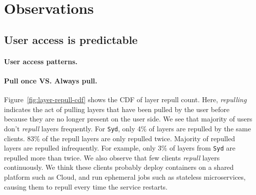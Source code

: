 \section{Observations}
\label{sec:dataset-analysis}

%
%

%




\subsection{User access is predictable}


\paragraph{User access patterns.}

\paragraph{Pull once VS. Always pull.}

Figure~\ref{fig:layer-repull-cdf} shows the CDF of layer repull count. Here, \emph{repulling} indicates the act of pulling layers that have been pulled by the user before because they are no longer present on the user side.
We see that majority of users don't \emph{repull} layers frequently.
For \texttt{Syd}, only 4\% of layers are repulled by the same clients. 83\% of the repull layers are only repulled twice.
Majority of repulled layers are repulled infrequently.
For example, only 3\% of layers from \texttt{Syd} are repulled more than twice.
We also observe that few clients \emph{repull} layers continuously.
We think these clients probably deploy containers on a shared platform such as Cloud,
and run ephemeral jobs such as stateless microservices, causing them to repull every time the service restarts.

